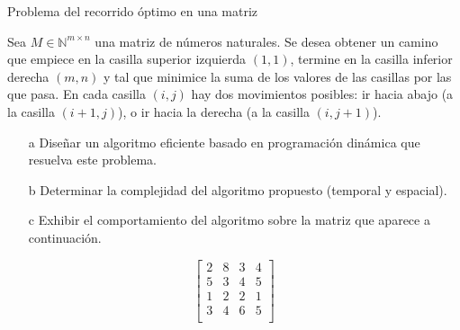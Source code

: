 \documentclass[compress]{beamer}
\begin{document}
\begin{frame}{Problema del recorrido óptimo en una matriz}

\small
	Sea $M \in \mathbb{N}^{m \times n}$ una matriz de números naturales. Se desea obtener un camino que empiece en la casilla superior
    izquierda $(1,1)$, termine en la casilla inferior derecha $(m,n)$ y tal que minimice la suma de los valores de las casillas por
    las que pasa. En cada casilla $(i,j)$ hay dos movimientos posibles: ir hacia abajo (a la casilla $(i+1, j)$), o ir hacia la
    derecha (a la casilla $(i, j+1)$).
   \begin{itemize}
   \item[a] Diseñar un algoritmo eficiente basado en programación dinámica que resuelva este problema.
   \item[b] Determinar la complejidad del algoritmo propuesto (temporal y espacial).
   \item[c] Exhibir el comportamiento del algoritmo sobre la matriz que aparece a continuación.
  \end{itemize}
                \[ \left [  \begin{array}{cccc}
2 & 8 & 3 & 4 \\
5 & 3 & 4 & 5 \\
1 & 2 & 2 & 1 \\
3 & 4 & 6 & 5 \\
 \end{array} \right ] \]

\end{frame}
\end{document}
